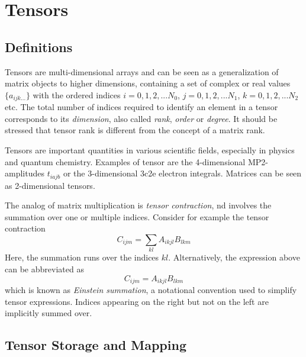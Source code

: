 
\section{Tensors}

\subsection{Definitions}

Tensors are multi-dimensional arrays and can be seen as a generalization of matrix objects to higher dimensions, containing a set of complex or real values $\{a_{ijk...}\}$ with the ordered indices $i = 0,1,2,...N_0$, $j = 0,1,2,...N_1$, $k = 0,1,2,...N_2$ etc. The total number of indices required to identify an element in a tensor corresponds to its \emph{dimension}, also called \emph{rank}, \emph{order} or \emph{degree}. It should be stressed that tensor rank is different from the concept of a matrix rank. 

Tensors are important quantities in various scientific fields, especially in physics and quantum chemistry. Examples of tensor are the 4-dimensional MP2-amplitudes $t_{iajb}$ or the 3-dimensional 3c2e electron integrals. Matrices can be seen as 2-dimensional tensors. 

The analog of matrix multiplication is \emph{tensor contraction}, nd involves the summation over one or multiple indices. Consider for example the tensor contraction
\begin{equation}
C_{ijm} = \sum_{kl} A_{ikjl} B_{lkm}
\end{equation}
\noindent Here, the summation runs over the indices $kl$. Alternatively, the expression above can be abbreviated as
\begin{equation}
C_{ijm} = A_{ikjl} B_{lkm}
\label{eq:TENEX}
\end{equation}
\noindent which is known as  \emph{Einstein summation}, a notational convention used to simplify tensor expressions. Indices appearing on the right but not on the left are implicitly summed over. 

\subsection{Tensor Storage and Mapping \label{sec:tenstor}}

